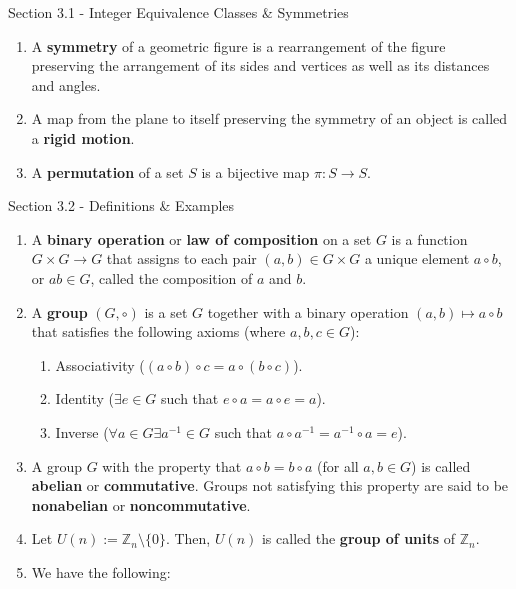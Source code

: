 \documentclass[12pt]{article}
\theoremstyle{definition}
\theoremstyle{named}
\begin{document}
\begin{section}{Section 3.1 - Integer Equivalence Classes \& Symmetries}
    \begin{enumerate}
        \item A \textbf{symmetry} of a geometric figure is a rearrangement of the figure preserving the arrangement of its sides and vertices as well as its distances and angles. 
        \item A map from the plane to itself preserving the symmetry of an object is called a \textbf{rigid motion}. 
        \item A \textbf{permutation} of a set $S$ is a bijective map $\pi: S \to S$. 
    \end{enumerate}
\end{section}

\begin{section}{Section 3.2 - Definitions \& Examples}
    \begin{enumerate}
        \item A \textbf{binary operation} or \textbf{law of composition} on a set $G$ is a function $G \times G \to G$ that assigns to each pair $(a,b) \in G \times G$ a unique element $a \circ b$, or $ab \in G$, called the composition of $a$ and $b$. 
        \item A \textbf{group} $(G, \circ)$ is a set $G$ together with a binary operation $(a,b) \mapsto a \circ b$ that satisfies the following axioms (where $a,b,c \in G$): 
        \begin{enumerate}
            \item Associativity ($(a \circ b) \circ c = a \circ (b \circ c)$). 
            \item Identity ($\exists e \in G$ such that $e \circ a = a \circ e = a$). 
            \item Inverse ($\forall a \in G \exists a^{-1} \in G$ such that $a \circ a^{-1} = a^{-1} \circ a = e$). 
        \end{enumerate}
        \item A group $G$ with the property that $a \circ b = b \circ a$ (for all $a,b \in G$) is called \textbf{abelian} or \textbf{commutative}. Groups not satisfying this property are said to be \textbf{nonabelian} or \textbf{noncommutative}. 
        \item Let $U(n) := \mathbb{Z}_n \setminus \{0\}$. Then, $U(n)$ is called the \textbf{group of units} of $\mathbb{Z}_n$. 
        \item We have the following: 
        \begin{enumerate}

\end{enumerate}
\end{enumerate}
\end{section}
\end{document}
